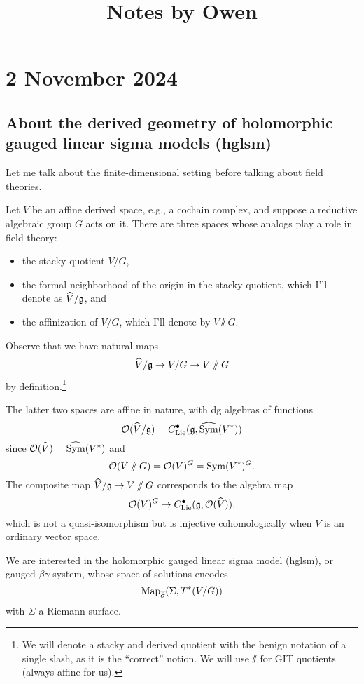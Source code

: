\documentclass[11pt]{amsart}
\newcommand{\clie}{C^\bu_{\rm Lie}}
\newcommand{\csym}{\widehat{\Sym}}
\begin{document}
 

\title{Notes by Owen}

\maketitle

\section{2 November 2024}

\subsection{About the derived geometry of holomorphic gauged linear sigma models (hglsm)}

Let me talk about the finite-dimensional setting before talking about field theories.

Let $V$ be an affine derived space, e.g., a cochain complex,
and suppose a reductive algebraic group $G$ acts on it.
There are three spaces whose analogs play a role in field theory:
\begin{itemize}
\item the stacky quotient $V/G$,
\item the formal neighborhood of the origin in the stacky quotient, which I'll denote as $\widehat{V}/\mathfrak g$, and
\item the affinization of $V/G$, which I'll denote by $V \sslash G$.
\end{itemize}
Observe that we have natural maps
\[
\widehat{V}/\mathfrak g \to V/G \to V\mathbin{/\mkern-6mu/} G
\]
by definition.\footnote{We will denote a stacky and derived quotient with the benign notation of a single slash, as it is the ``correct'' notion. We will use $\sslash$ for GIT quotients (always affine for us).}

The latter two spaces are affine in nature, with dg algebras of functions
\[
\cO(\widehat{V}/\fg) = \clie(\fg, \csym(V^*))
\]
since $\cO(\widehat{V}) = \csym(V^*)$ and
\[
\mathcal O(V\mathbin{/\mkern-6mu/} G) = \mathcal O(V)^G = \operatorname{Sym}(V^*)^G.
\]
The composite map $\widehat{V}/\mathfrak g \to V\mathbin{/\mkern-6mu/} G$ corresponds to the algebra map
\[
\cO(V)^G \to \clie(\fg, \cO(\widehat{V})),
\]
which is not a quasi-isomorphism but is injective cohomologically when $V$ is an ordinary vector space.

We are interested in the holomorphic gauged linear sigma model (hglsm), or gauged $\beta\gamma$ system, whose space of solutions encodes
\[
{\rm Map}_{\overline{\partial}}(\Sigma, T^*(V/G))
\]
with $\Sigma$ a Riemann surface.
\end{document}
